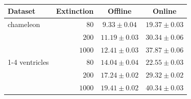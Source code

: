 \begin{table}
    \centering
    \footnotesize
    \begin{tabular}{lrcc}
        \toprule
        \textbf{Dataset} & \textbf{Extinction} & \textbf{Offline} & \textbf{Online} \\
        \midrule
        \textsf{chameleon} & $80$ & $9.33 \pm 0.04$ & $19.37 \pm 0.03$ \\
         & $200$ & $11.19 \pm 0.03$ & $30.34 \pm 0.06$ \\
         & $1000$ & $12.41 \pm 0.03$ & $37.87 \pm 0.06$ \\
        \cline{1-4}
        \textsf{ventricles} & $80$ & $14.04 \pm 0.04$ & $22.55 \pm 0.03$ \\
         & $200$ & $17.24 \pm 0.02$ & $29.32 \pm 0.02$ \\
         & $1000$ & $19.41 \pm 0.02$ & $40.34 \pm 0.03$ \\
        \bottomrule
    \end{tabular}
    \caption{\captiontimes{}}
    \label{tab:times}
\end{table}